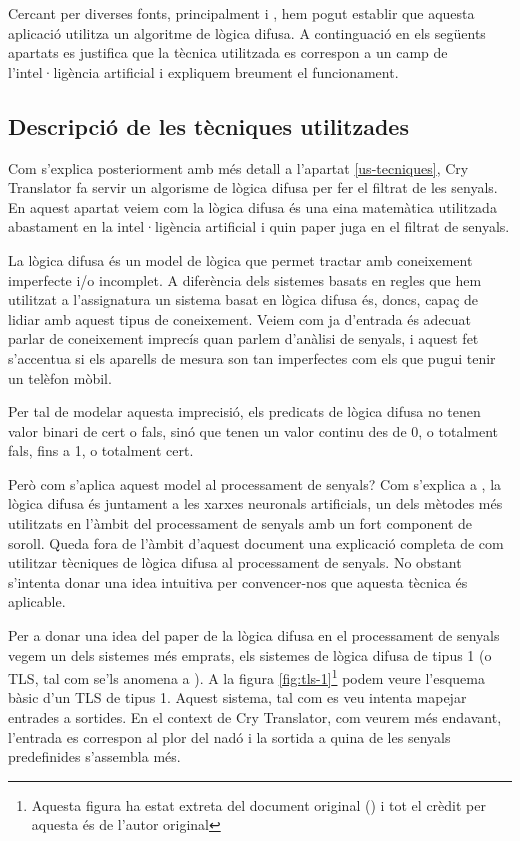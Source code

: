 \documentclass[11pt,a4paper]{article}
\begin{document}
Cercant per diverses fonts, principalment \cite{patent} i \cite{elmundo}, hem pogut establir que aquesta aplicació utilitza un algoritme de lògica difusa. A continguació en els següents apartats es justifica que la tècnica utilitzada es correspon a un camp de l'intel·ligència artificial i expliquem breument el funcionament.

\subsection{\textsf{Descripció de les tècniques utilitzades}}
\label{descripcio}

Com s'explica posteriorment amb més detall a l'apartat \ref{us-tecniques}, Cry Translator fa servir un algorisme de lògica difusa per fer el filtrat de les senyals. En aquest apartat veiem com la lògica difusa és una eina matemàtica utilitzada abastament en la intel·ligència artificial i quin paper juga en el filtrat de senyals.

La lògica difusa és un model de lògica que permet tractar amb coneixement imperfecte i/o incomplet. A diferència dels sistemes basats en regles que hem utilitzat a l'assignatura un sistema basat en lògica difusa és, doncs, capaç de lidiar amb aquest tipus de coneixement. Veiem com ja d'entrada és adecuat parlar de coneixement imprecís quan parlem d'anàlisi de senyals, i aquest fet s'accentua si els aparells de mesura son tan imperfectes com els que pugui tenir un telèfon mòbil.

Per tal de modelar aquesta imprecisió, els predicats de lògica difusa no tenen valor binari de cert o fals, sinó que tenen un valor continu des de 0, o totalment fals, fins a 1, o totalment cert. 

Però com s'aplica aquest model al processament de senyals? Com s'explica a \cite{fuzzy}, la lògica difusa és juntament a les xarxes neuronals artificials, un dels mètodes més utilitzats en l'àmbit del processament de senyals amb un fort component de soroll. Queda fora de l'àmbit d'aquest document una explicació completa de com utilitzar tècniques de lògica difusa al processament de senyals. No obstant s'intenta donar una idea intuitiva per convencer-nos que aquesta tècnica és aplicable.

Per a donar una idea del paper de la lògica difusa en el processament de senyals vegem un dels sistemes més emprats, els sistemes de lògica difusa de tipus 1 (o TLS, tal com se'ls anomena a \cite{fuzzy}). A la figura \ref{fig:tls-1}\footnote{Aquesta figura ha estat extreta del document original (\cite{fuzzy}) i tot el crèdit per aquesta és de l'autor original} podem veure l'esquema bàsic d'un TLS de tipus 1. Aquest sistema, tal com es veu intenta mapejar entrades a sortides. En el context de Cry Translator, com veurem més endavant, l'entrada es correspon al plor del nadó i la sortida a quina de les senyals predefinides s'assembla més. 
\end{document}
